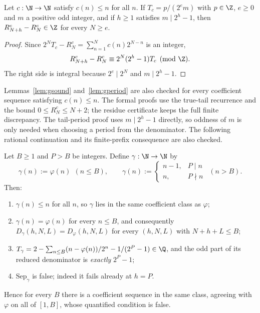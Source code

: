 \begin{lem}
\label{lem:gperiod}
Let $c:\N\to\N$ satisfy $c(n)\le n$ for all $n$. If
$T_c = p/(2^{e}m)$ with $p\in\Z$, $e\ge0$ and $m$ a positive odd integer,
and if $h\ge1$ satisfies
$m\mid 2^h-1$, then
$R^{c}_{N+h} - R^{c}_{N} \in \Z$ for every $N \ge e$.
\end{lem}

\begin{proof}
Since $2^NT_c-R^c_N=\sum_{n=1}^N c(n)2^{N-n}$ is an integer,
\[
 R^c_{N+h}-R^c_N\equiv2^N(2^h-1)T_c\pmod\Z.
\]
The right side is integral because $2^e\mid2^N$ and $m\mid2^h-1$.
\end{proof}

\begin{rem}
Lemmas~\ref{lem:gsound} and~\ref{lem:gperiod} are also checked for every
coefficient sequence satisfying $c(n)\le n$. The formal proofs use the
true-tail recurrence and the bound $0\le R^c_N\le N+2$; the residue
certificate keeps the full finite discrepancy. The tail-period proof uses
$m\mid2^h-1$ directly, so oddness of $m$ is only needed when choosing a
period from the denominator. The following rational continuation and its
finite-prefix consequence are also checked.
\end{rem}

\begin{thm}
\label{thm:gamma}
Let $B\ge1$ and $P>B$ be integers. Define $\gamma : \N \to \N$ by
\[
  \gamma(n) := \varphi(n) \ \ (n \le B), \qquad
  \gamma(n) := \begin{cases} n-1, & P \mid n \\ n, & P \nmid n \end{cases}
  \ \ (n > B).
\]
Then:
\begin{enumerate}[label=(\roman*),leftmargin=*]
\item $\gamma(n) \le n$ for all $n$, so $\gamma$ lies in the same coefficient
  class as $\varphi$;
\item $\gamma(n) = \varphi(n)$ for every $n \le B$, and consequently
  $D_\gamma(h,N,L) = D_\varphi(h,N,L)$ for every $(h,N,L)$ with
  $N + h + L \le B$;
\item $T_\gamma = 2-\sum_{n\le B}(n-\varphi(n))/2^n-1/(2^P-1)\in\Q$,
  and the odd part of its reduced denominator is \emph{exactly} $2^P-1$;
\item $\mathrm{Sep}_\gamma$ is false; indeed it fails already at $h = P$.
\end{enumerate}
Hence for every $B$ there is a coefficient sequence in the same class,
agreeing with $\varphi$ on all of $[1,B]$, whose quantified condition is false.
\end{thm}

